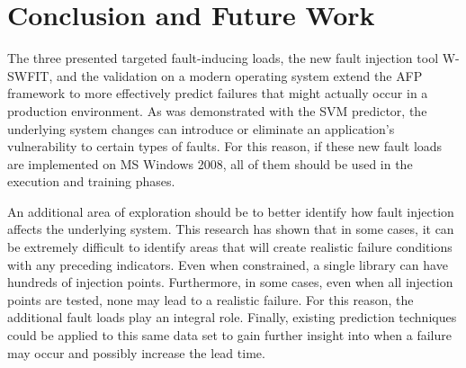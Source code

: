 \section{Conclusion and Future Work} \label{chapter5}
The three presented targeted fault-inducing loads, the new fault injection tool
\ac{W-SWFIT}, and the validation on a modern operating system extend the
\ac{AFP} framework to more effectively predict failures that might actually
occur in a production environment.  As was demonstrated with the \ac{SVM}
predictor, the underlying system changes can introduce or eliminate an
application’s vulnerability to certain types of faults.  For this reason, if
these new fault loads are implemented on \ac{MS} Windows 2008, all of them
should be used in the execution and training phases.

An additional area of exploration should be to better identify how fault
injection affects the underlying system.  This research has shown that in some
cases, it can be extremely difficult to identify areas that will create
realistic failure conditions with any preceding indicators.  Even when
constrained, a single library can have hundreds of injection points.
Furthermore, in some cases, even when all injection points are tested, none may
lead to a realistic failure.  For this reason, the additional fault loads play
an integral role.  Finally, existing prediction techniques could be applied to
this same data set to gain further insight into when a failure may occur and
possibly increase the lead time.
